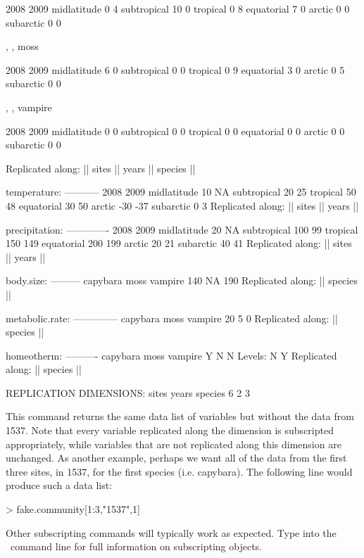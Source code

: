 \documentclass[a4paper]{report}
\numberwithin{exercise}{section}
\begin{document}
\begin{article}
\begin{Schunk}
\begin{Soutput}
            2008 2009
midlatitude    0    4
subtropical   10    0
tropical       0    8
equatorial     7    0
arctic         0    0
subarctic      0    0

, , moss

            2008 2009
midlatitude    6    0
subtropical    0    0
tropical       0    9
equatorial     3    0
arctic         0    5
subarctic      0    0

, , vampire

            2008 2009
midlatitude    0    0
subtropical    0    0
tropical       0    0
equatorial     0    0
arctic         0    0
subarctic      0    0

Replicated along:  || sites || years || species || 


temperature:
-----------
            2008 2009
midlatitude   10   NA
subtropical   20   25
tropical      50   48
equatorial    30   50
arctic       -30  -37
subarctic      0    3
Replicated along:  || sites || years || 


precipitation:
-------------
            2008 2009
midlatitude   20   NA
subtropical  100   99
tropical     150  149
equatorial   200  199
arctic        20   21
subarctic     40   41
Replicated along:  || sites || years || 


body.size:
---------
capybara     moss  vampire 
     140       NA      190 
Replicated along:  || species || 


metabolic.rate:
--------------
capybara     moss  vampire 
      20        5        0 
Replicated along:  || species || 


homeotherm:
----------
capybara     moss  vampire 
       Y        N        N 
Levels: N Y
Replicated along:  || species || 


REPLICATION DIMENSIONS: 
  sites   years species 
      6       2       3 
\end{Soutput}
\end{Schunk}
This command returns the same data list of variables but without the data from 1537.  Note that every variable replicated along the  dimension is subscripted appropriately, while variables that are not replicated along this dimension are unchanged.  As another example, perhaps we want all of the data from the first three sites, in 1537, for the first species (i.e. capybara).  The following line would produce such a data list:
\begin{Schunk}
\begin{Sinput}
> fake.community[1:3,"1537",1]
\end{Sinput}
\end{Schunk}
Other subscripting commands will typically work as expected.  Type  into the \R\ command line for full information on subscripting  objects.


\end{article}
\end{document}
